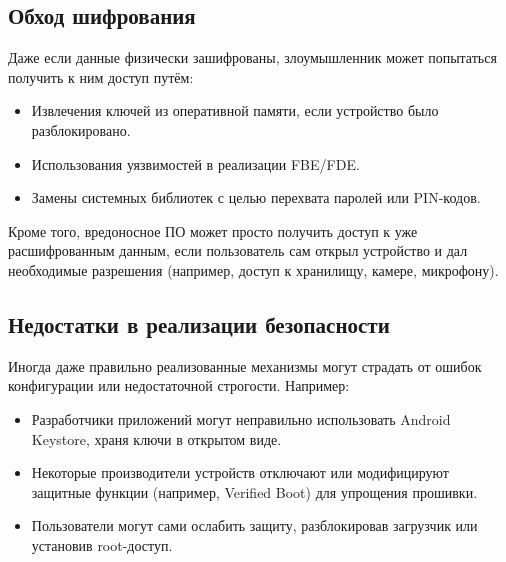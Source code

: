 \subsection{Обход шифрования}

Даже если данные физически зашифрованы, злоумышленник может попытаться получить
к ним доступ путём:

\begin{itemize}
    \item Извлечения ключей из оперативной памяти, если устройство было разблокировано.
    \item Использования уязвимостей в реализации FBE/FDE.
    \item Замены системных библиотек с целью перехвата паролей или PIN-кодов.
\end{itemize}

Кроме того, вредоносное ПО может просто получить доступ к уже расшифрованным
данным, если пользователь сам открыл устройство и дал необходимые разрешения
(например, доступ к хранилищу, камере, микрофону).

\subsection{Недостатки в реализации безопасности}

Иногда даже правильно реализованные механизмы могут страдать от ошибок
конфигурации или недостаточной строгости. Например:

\begin{itemize}
    \item Разработчики приложений могут неправильно использовать Android
        Keystore, храня ключи в открытом виде.
    \item Некоторые производители устройств отключают или модифицируют защитные
        функции (например, Verified Boot) для упрощения прошивки.
    \item Пользователи могут сами ослабить защиту, разблокировав загрузчик или
        установив root-доступ.
\end{itemize}

